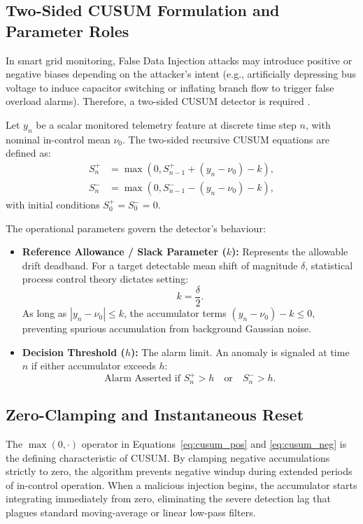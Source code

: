 \documentclass[12pt,a4paper]{report}
\begin{document}
\subsection{Two-Sided CUSUM Formulation and Parameter Roles}
In smart grid monitoring, False Data Injection attacks may introduce positive or negative
biases depending on the attacker's intent (e.g., artificially depressing bus voltage to
induce capacitor switching or inflating branch flow to trigger false overload alarms).
Therefore, a two-sided CUSUM detector is required \cite{montgomery2019,huang2016}.

Let $y_n$ be a scalar monitored telemetry feature at discrete time step $n$, with nominal
in-control mean $\nu_0$. The two-sided recursive CUSUM equations are defined as:
\begin{align}
S_n^+ &= \max\left(0, S_{n-1}^+ + (y_n - \nu_0) - k\right), \label{eq:cusum_pos} \\
S_n^- &= \max\left(0, S_{n-1}^- - (y_n - \nu_0) - k\right), \label{eq:cusum_neg}
\end{align}
with initial conditions $S_0^+ = S_0^- = 0$.

The operational parameters govern the detector's behaviour:
\begin{itemize}
    \item \textbf{Reference Allowance / Slack Parameter ($k$):} Represents the allowable
    drift deadband. For a target detectable mean shift of magnitude $\delta$, statistical
    process control theory dictates setting:
    \begin{equation}
    k = \frac{\delta}{2}.
    \end{equation}
    As long as $|y_n - \nu_0| \le k$, the accumulator terms $(y_n - \nu_0) - k \le 0$,
    preventing spurious accumulation from background Gaussian noise.
    \item \textbf{Decision Threshold ($h$):} The alarm limit. An anomaly is signaled at
    time $n$ if either accumulator exceeds $h$:
    \begin{equation}
    \text{Alarm Asserted if } S_n^+ > h \quad \text{or} \quad S_n^- > h.
    \end{equation}
\end{itemize}

\subsection{Zero-Clamping and Instantaneous Reset}
The $\max(0, \cdot)$ operator in Equations~\eqref{eq:cusum_pos} and \eqref{eq:cusum_neg}
is the defining characteristic of CUSUM. By clamping negative accumulations strictly to zero,
the algorithm prevents negative windup during extended periods of in-control operation.
When a malicious injection begins, the accumulator starts integrating immediately from zero,
eliminating the severe detection lag that plagues standard moving-average or linear low-pass filters.
\end{document}
